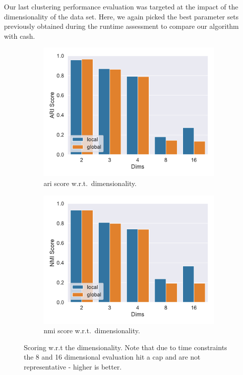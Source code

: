 Our last clustering performance evaluation was targeted at the impact of the dimensionality of the data set. Here, we again picked the best parameter sets previously obtained during the runtime assessment to compare our algorithm with \gls{cash}.
\begin{figure}[h]
    \centering
    \begin{subfigure}[t]{.5\textwidth}
      \centering  
      \captionsetup{width=.9\linewidth}
      \includegraphics[width=\textwidth]{new_evaluation/per_dims/Best_ARI_O10000_N5_pdims_bar.pdf}
      \caption{\gls{ari} score w.r.t.\ dimensionality.}
      \label{fig:ariperpts}
    \end{subfigure}%
    \begin{subfigure}[t]{.5\textwidth}
      \centering
      \captionsetup{width=.9\linewidth}
      \includegraphics[width=\textwidth]{new_evaluation/per_dims/Best_NMI_O10000_N5_pdims_bar.pdf}
      \caption{\gls{nmi} score w.r.t.\ dimensionality.}
      \label{fig:nmiperpts}
    \end{subfigure}
    \caption[Scoring w.r.t the dimensionality - higher is better.]{Scoring w.r.t the dimensionality. Note that due to time constraints the 8 and 16 dimensional evaluation hit a cap and are not representative  - higher is better.}
    \label{fig:scoreperdims}
\end{figure}


